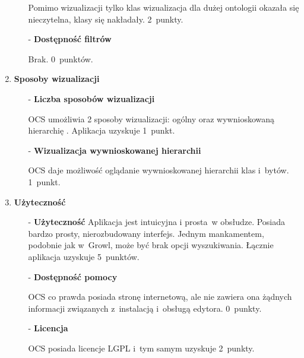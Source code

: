 \begin{enumerate}
\begin{itemize}
  \nopagebreak
Pomimo wizualizacji tylko klas wizualizacja dla dużej ontologii okazała się nieczytelna, klasy się nakładały. 2~punkty.


 \item[-]{\bf Dostępność filtrów} 

  \nopagebreak
Brak. 0~punktów. 

\end{itemize}

\item{\bf Sposoby wizualizacji}
\begin{itemize}
 \item[-]{\bf Liczba sposobów wizualizacji } 

  \nopagebreak
OCS umożliwia 2 sposoby wizualizacji: ogólny oraz wywnioskowaną hierarchię . Aplikacja uzyskuje 1~punkt.
 

 \item[-]{\bf  Wizualizacja wywnioskowanej hierarchii } 

  \nopagebreak
OCS daje możliwość oglądanie wywnioskowanej hierarchii klas i~bytów. 1~punkt.

\end{itemize}


\item{\bf Użyteczność}
\begin{itemize}
 \item[-]{\bf Użyteczność  } 
  Aplikacja jest intuicyjna i prosta~w obsłudze. Posiada bardzo prosty, nierozbudowany interfejs. Jednym mankamentem, podobnie jak w~Growl, może 
być brak opcji wyszukiwania. 
Łącznie aplikacja uzyskuje 5~punktów.
  \nopagebreak


 \item[-]{\bf Dostępność pomocy  } 

  \nopagebreak
OCS co prawda posiada stronę internetową, ale nie zawiera ona żądnych informacji związanych z~instalacją i~obsługą edytora. 0~punkty.



 \item[-]{\bf Licencja  } 

  \nopagebreak
OCS posiada licencje LGPL i~tym samym uzyskuje 2~punkty.
\end{itemize}


\end{enumerate}




